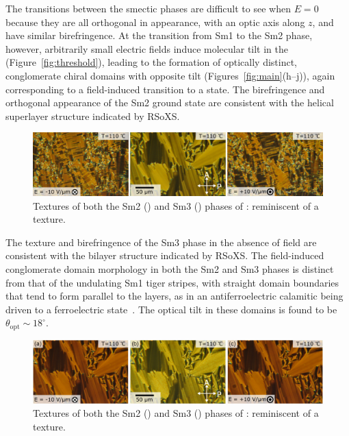 \documentclass[aagreenthesis]{subfiles}
\begin{document}
The transitions between the smectic phases are difficult to see when $E=0$ because they are all orthogonal in appearance,
with an optic axis along $z$, and have similar birefringence.
At the transition from Sm1 to the Sm2 phase,  however, arbitrarily small electric fields induce molecular tilt in the
(Figure~\ref{fig:threshold}), leading to the formation of optically distinct, conglomerate chiral
domains with opposite tilt (Figures~\ref{fig:main}(h--j)), again
corresponding to a field-induced transition to a  state.
The birefringence and orthogonal appearance of the Sm2 ground state are consistent with
the helical superlayer structure indicated by RSoXS.

\begin{figure}[h!]
    \centering
    \includegraphics[width=\textwidth]{figs/pal30/textureSM2/sm2Textures100.png}
    \caption{\label{fig:pal30:planar-textures} Textures of both the
        Sm2 (\smcpalpha{}) and Sm3 (\smcapa{})
    phases of \nfour{}: reminiscent of a \smcapa{} texture. }
\end{figure}


The texture and birefringence of the Sm3 phase in the absence of field are consistent with the  bilayer structure indicated by RSoXS.
The field-induced conglomerate domain morphology in both the Sm2 and Sm3 phases is distinct from that of the undulating Sm1
tiger stripes, with straight
domain boundaries that tend to form parallel to the layers, as in an
antiferroelectric calamitic being driven to a ferroelectric
state~\cite{li1995reversible}.
The optical tilt in these domains is found to be $\theta_\mathrm{opt}\sim 18^\circ$.
\begin{figure}[h!]
    \centering
    \includegraphics[width=\textwidth]{figs/pal30/texturesm4/sm4Textures100.png}
    \caption{\label{fig:pal30:planar-textures} Textures of both the
        Sm2 (\smcpalpha{}) and Sm3 (\smcapa{})
    phases of \nfour{}: reminiscent of a \smcapa{} texture. }
\end{figure}
\end{document}
